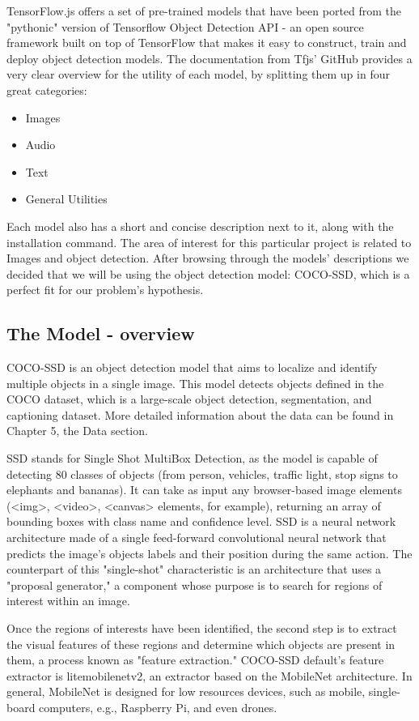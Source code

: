 \documentclass[runningheads,a4paper,11pt]{report}
\begin{document}
TensorFlow.js offers a set of pre-trained models that have been ported from the "pythonic" version of Tensorflow Object Detection API - an open source framework built on top of TensorFlow that makes it easy to construct, train and deploy object detection models. The documentation from Tfjs' GitHub provides a very clear overview for the utility of each model, by splitting them up in four great categories: 
\begin{itemize}
  \item Images
  \item Audio
  \item Text
  \item General Utilities
\end{itemize}
Each model also has a short and concise description next to it, along with the installation command. The area of interest for this particular project is related to Images and object detection. After browsing through the models' descriptions we decided that we will be using the object detection model: COCO-SSD, which is a perfect fit for our problem's hypothesis. 

\subsection{The Model - overview}
\label{section:theModelOverview}

COCO-SSD is an object detection model that aims to localize and identify multiple objects in a single image. This model detects objects defined in the COCO dataset, which is a large-scale object detection, segmentation, and captioning dataset. More detailed information about the data can be found in Chapter 5, the Data section. 


SSD stands for Single Shot MultiBox Detection, as the model is capable of detecting 80 classes of objects (from person, vehicles, traffic light, stop signs to elephants and bananas). It can take as input any browser-based image elements (<img>, <video>, <canvas> elements, for example), returning an array of bounding boxes with class name and confidence level. SSD is a neural network architecture made of a single feed-forward convolutional neural network that predicts the image's objects labels and their position during the same action. The counterpart of this "single-shot" characteristic is an architecture that uses a "proposal generator," a component whose purpose is to search for regions of interest within an image.

Once the regions of interests have been identified, the second step is to extract the visual features of these regions and determine which objects are present in them, a process known as "feature extraction." COCO-SSD default's feature extractor is lite\textunderscore mobilenet\textunderscore v2, an extractor based on the MobileNet architecture. In general, MobileNet is designed for low resources devices, such as mobile, single-board computers, e.g., Raspberry Pi, and even drones.
\end{document}
